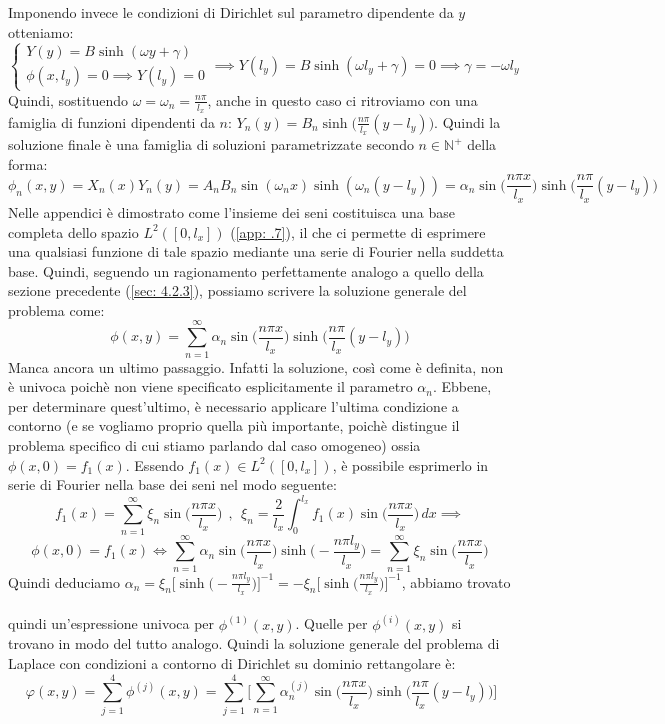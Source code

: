 \documentclass[a4paper,12pt]{report}
\begin{document}
\newpage
Imponendo invece le condizioni di Dirichlet sul parametro dipendente da $y$ otteniamo:
\[\begin{cases}
    Y(y)=B\sinh(\omega y+\gamma)
    \\\phi(x,l_y)=0\implies Y(l_y)=0 
\end{cases}\implies Y(l_y)=B\sinh(\omega l_y+\gamma)=0\implies \gamma=-\omega l_y\]
Quindi, sostituendo $\omega=\omega_n=\displaystyle\frac{n\pi}{l_x}$, anche in questo caso ci ritroviamo con una famiglia di funzioni dipendenti da $n$: $Y_n(y)=B_n\sinh\bigg(\displaystyle\frac{n\pi}{l_x}(y-l_y)\bigg)$. Quindi la soluzione finale è una famiglia di soluzioni parametrizzate secondo $n\in\mathbb{N}^+$ della forma:
\[\phi_n(x,y)=X_n(x)Y_n(y)=A_nB_n\sin(\omega_nx)\sinh(\omega_n(y-l_y))=\alpha_n\sin\bigg(\frac{n\pi x}{l_x}\bigg)\sinh\bigg(\frac{n\pi}{l_x}(y-l_y)\bigg)\]
Nelle appendici è dimostrato come l'insieme dei seni costituisca una base completa dello spazio $L^2([0,l_x])$ (\ref{app: .7}), il che ci permette di esprimere una qualsiasi funzione di tale spazio mediante una serie di Fourier nella suddetta base. Quindi, seguendo un ragionamento perfettamente analogo a quello della sezione precedente (\ref{sec: 4.2.3}), possiamo scrivere la soluzione generale del problema come:
\[\phi(x,y)=\sum_{n=1}^\infty \alpha_n\sin\bigg(\frac{n\pi x}{l_x}\bigg)\sinh\bigg(\frac{n\pi}{l_x}(y-l_y)\bigg)\]
Manca ancora un ultimo passaggio. Infatti la soluzione, così come è definita, non è univoca poichè non viene specificato esplicitamente il parametro $\alpha_n$. Ebbene, per determinare quest'ultimo, è necessario applicare l'ultima condizione a contorno (e se vogliamo proprio quella più importante, poichè distingue il problema specifico di cui stiamo parlando dal caso omogeneo) ossia $\phi(x,0)=f_1(x)$. Essendo $f_1(x)\in L^2([0,l_x])$, è possibile esprimerlo in serie di Fourier nella base dei seni nel modo seguente: \[f_1(x)=\displaystyle\sum_{n=1}^\infty\xi_n\sin\bigg(\frac{n\pi x}{l_x}\bigg) \ \ ,\ \ \xi_n=\frac{2}{l_x}\int_0^{l_x}f_1(x)\sin\bigg(\frac{n\pi x}{l_x}\bigg)\,dx\implies\]
\[\phi(x,0)=f_1(x)\iff\sum_{n=1}^\infty\alpha_n\sin\bigg(\frac{n\pi x}{l_x}\bigg)\sinh\bigg(-\frac{n\pi l_y}{l_x}\bigg)=\sum_{n=1}^\infty\xi_n\sin\bigg(\frac{n\pi x}{l_x}\bigg)\]
Quindi deduciamo $\alpha_n=\xi_n\bigg[\sinh\bigg(-\displaystyle\frac{n\pi l_y}{l_x}\bigg)\bigg]^{-1}=-\xi_n\bigg[\sinh\bigg(\frac{n\pi l_y}{l_x}\bigg)\bigg]^{-1}$, abbiamo trovato
\\
\\quindi un'espressione univoca per $\phi^{(1)}(x,y)$. Quelle per $\phi ^{(i)}(x,y)$ si trovano in modo del tutto analogo. Quindi la soluzione generale del problema di Laplace con condizioni a contorno di Dirichlet su dominio rettangolare è:
\[\
    \varphi(x,y)=\sum_{j=1}^4\phi^{(j)}(x,y)=\sum_{j=1}^4\bigg[\sum_{n=1}^\infty\alpha_n^{(j)}\sin\bigg(\frac{n\pi x}{l_x}\bigg)\sinh\bigg(\frac{n\pi}{l_x}(y-l_y)\bigg)\bigg]\]
\end{document}
